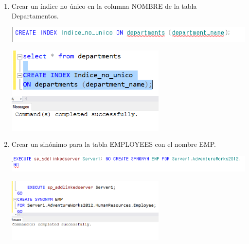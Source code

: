 \begin{enumerate}[1.]
	\item Crear un índice no único en la columna NOMBRE de la tabla Departamentos.
	\\ 
	\begin{center}
	\includegraphics[width=15cm]{./Imagenes/activ3_7} 
	\end{center}		
	\begin{center}
	\includegraphics[width=8cm]{./Imagenes/actividad_03_07} 
	\end{center}	

	\item Crear un sinónimo para la tabla EMPLOYEES con el nombre EMP.
	\\
	\begin{center}
	\includegraphics[width=15cm]{./Imagenes/activ3_8}  
	\end{center}	
	\begin{center}
	\includegraphics[width=8cm]{./Imagenes/actividad_03_08}  
	\end{center}	

\end{enumerate}

